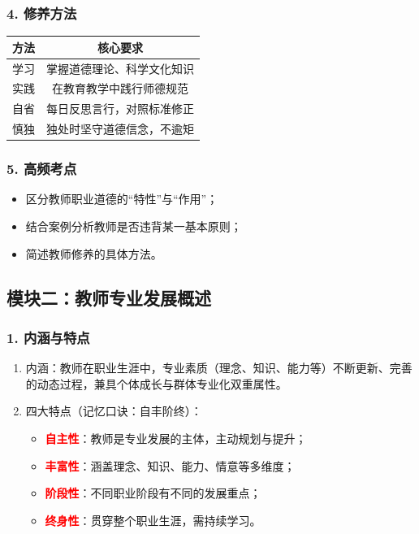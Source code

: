 \documentclass[12pt,a4paper]{article}
\newcommand{\important}[1]{\textbf{\textcolor{red}{#1}}} %
\begin{document}
\subsubsection{4. 修养方法}
\begin{center}
\begin{tabular}{|c|c|}
\hline
\textbf{方法} & \textbf{核心要求} \\
\hline
学习 & 掌握道德理论、科学文化知识 \\
\hline
实践 & 在教育教学中践行师德规范 \\
\hline
自省 & 每日反思言行，对照标准修正 \\
\hline
慎独 & 独处时坚守道德信念，不逾矩 \\
\hline
\end{tabular}
\end{center}

\subsubsection{5. 高频考点}
\begin{itemize}
    \item 区分教师职业道德的“特性”与“作用”；
    \item 结合案例分析教师是否违背某一基本原则；
    \item 简述教师修养的具体方法。
\end{itemize}

\subsection{模块二：教师专业发展概述}
\subsubsection{1. 内涵与特点}
\begin{enumerate}[label=1.,itemsep=0.3ex]
\item 内涵：教师在职业生涯中，专业素质（理念、知识、能力等）不断更新、完善的动态过程，兼具个体成长与群体专业化双重属性。
\item 四大特点（记忆口诀：自丰阶终）：
    \begin{itemize}
        \item \important{自主性}：教师是专业发展的主体，主动规划与提升；
        \item \important{丰富性}：涵盖理念、知识、能力、情意等多维度；
        \item \important{阶段性}：不同职业阶段有不同的发展重点；
        \item \important{终身性}：贯穿整个职业生涯，需持续学习。
    \end{itemize}
\end{enumerate}
\end{document}
